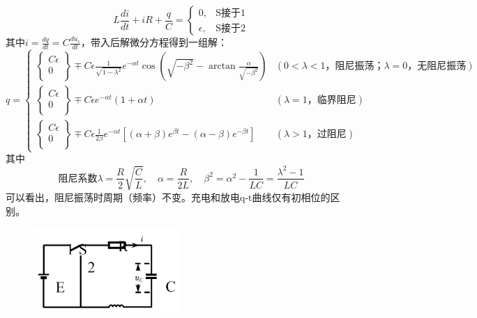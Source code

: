 \documentclass[UTF8]{article}
\begin{document}
\begin{enumerate}
    \[L\frac{di}{dt}+iR+\frac{q}{C}=\begin{cases}0,&\text{S接于1}\\ \epsilon,&\text{S接于2}\end{cases}\]
    \hspace*{2em} 其中$i=\frac{dq}{dt}=C\frac{du_c}{dt}$，带入后解微分方程得到一组解：
    \[
        q=\begin{cases}
        \left\{ \begin{matrix}{C\epsilon}\\0\\\end{matrix}\right\}\mp C\epsilon\frac{1}{\sqrt{1-\lambda^2}}e^{-\alpha t}\cos{\left(\sqrt{-\beta^2}-\arctan{\frac{\alpha}{\sqrt{-\beta^2}}}\right)}  &(0<\lambda<1 \text{，阻尼振荡；}\lambda=0 \text{，无阻尼振荡})\\
        \left\{ \begin{matrix}{C\epsilon}\\0\\\end{matrix}\right\}\mp C\epsilon e^{-\alpha t}\left( 1+\alpha t\right)  &(\lambda=1 \text{，临界阻尼})\\
        \left\{ \begin{matrix}{C\epsilon}\\0\\\end{matrix}\right\}\mp C\epsilon \frac{1}{2\beta} e^{-\alpha t}\left[ \left( \alpha + \beta\right)e^{\beta t}-\left( \alpha - \beta \right)e^{-\beta t}  \right] &(\lambda>1 \text{，过阻尼})
        \end{cases}
    \]
    \hspace*{2em}其中
    \[
        \text{阻尼系数}\lambda=\frac{R}{2} \sqrt{\frac{C}{L}},\quad
        \alpha=\frac{R}{2L},\quad
        \beta^2=\alpha^2-\frac{1}{LC}=\frac{\lambda^2-1}{LC}
    \]
    \hspace*{2em}可以看出，阻尼振荡时周期（频率）不变。充电和放电q-t曲线仅有初相位的区别。
    \begin{figure}[H]
        \begin{minipage}[t]{0.33\linewidth}
            \centering
            \includegraphics[width=5.5cm]{Fig/7.png}

\end{minipage}
\end{figure}
\end{enumerate}
\end{document}
